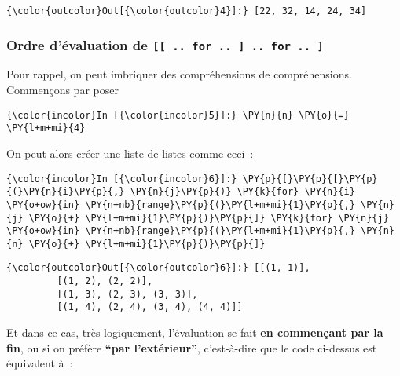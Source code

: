 \begin{Verbatim}[commandchars=\\\{\}]
{\color{outcolor}Out[{\color{outcolor}4}]:} [22, 32, 14, 24, 34]
\end{Verbatim}
            
    \hypertarget{ordre-duxe9valuation-de-..-for-..-..-for-..}{%
\subsubsection{\texorpdfstring{Ordre d'évaluation de
\texttt{{[}{[}\ ..\ for\ ..\ {]}\ ..\ for\ ..\ {]}}}{Ordre d'évaluation de {[}{[} .. for .. {]} .. for .. {]}}}\label{ordre-duxe9valuation-de-..-for-..-..-for-..}}

    Pour rappel, on peut imbriquer des compréhensions de compréhensions.
Commençons par poser

    \begin{Verbatim}[commandchars=\\\{\}]
{\color{incolor}In [{\color{incolor}5}]:} \PY{n}{n} \PY{o}{=} \PY{l+m+mi}{4}
\end{Verbatim}


    On peut alors créer une liste de listes comme ceci~:

    \begin{Verbatim}[commandchars=\\\{\}]
{\color{incolor}In [{\color{incolor}6}]:} \PY{p}{[}\PY{p}{[}\PY{p}{(}\PY{n}{i}\PY{p}{,} \PY{n}{j}\PY{p}{)} \PY{k}{for} \PY{n}{i} \PY{o+ow}{in} \PY{n+nb}{range}\PY{p}{(}\PY{l+m+mi}{1}\PY{p}{,} \PY{n}{j} \PY{o}{+} \PY{l+m+mi}{1}\PY{p}{)}\PY{p}{]} \PY{k}{for} \PY{n}{j} \PY{o+ow}{in} \PY{n+nb}{range}\PY{p}{(}\PY{l+m+mi}{1}\PY{p}{,} \PY{n}{n} \PY{o}{+} \PY{l+m+mi}{1}\PY{p}{)}\PY{p}{]}
\end{Verbatim}


\begin{Verbatim}[commandchars=\\\{\}]
{\color{outcolor}Out[{\color{outcolor}6}]:} [[(1, 1)],
         [(1, 2), (2, 2)],
         [(1, 3), (2, 3), (3, 3)],
         [(1, 4), (2, 4), (3, 4), (4, 4)]]
\end{Verbatim}
            
    Et dans ce cas, très logiquement, l'évaluation se fait \textbf{en
commençant par la fin}, ou si on préfère \textbf{``par l'extérieur''},
c'est-à-dire que le code ci-dessus est équivalent à~:

